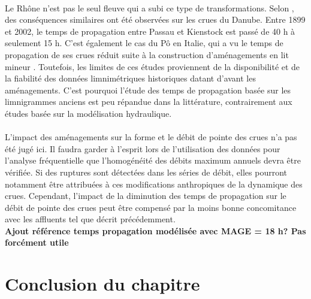 \documentclass[11pt]{article}
\begin{document}
	\paragraph{} Le Rhône n'est pas le seul fleuve qui a subi ce type de transformations. Selon \citet{mitkova_analysis_2005}, des conséquences similaires ont été observées sur les crues du Danube. Entre 1899 et 2002, le temps de propagation entre Passau et Kienstock est passé de 40 h à seulement 15 h. C'est également le cas du Pô en Italie, qui a vu le temps de propagation de ses crues réduit suite à la construction d'aménagements en lit mineur \citep{di_baldassare_analysis_2009}. Toutefois, les limites de ces études proviennent de la disponibilité et de la fiabilité des données limnimétriques historiques datant d'avant les aménagements. C'est pourquoi l'étude des temps de propagation basée sur les limnigrammes anciens est peu répandue dans la littérature, contrairement aux études basée sur la modélisation hydraulique.
	
	\paragraph{} L'impact des aménagements sur la forme et le débit de pointe des crues n'a pas été jugé ici. Il faudra garder à l'esprit lors de l'utilisation des données pour l'analyse fréquentielle que l'homogénéité des débits maximum annuels devra être vérifiée. Si des ruptures sont détectées dans les séries de débit, elles pourront notamment être attribuées à ces modifications anthropiques de la dynamique des crues. Cependant, l'impact de la diminution des temps de propagation sur le débit de pointe des crues peut être compensé par la moins bonne concomitance avec les affluents tel que décrit précédemment.\\
	\textbf{Ajout référence temps propagation modélisée avec MAGE = 18 h? Pas forcément utile}
	
\FloatBarrier
\section{Conclusion du chapitre}
\end{document}
